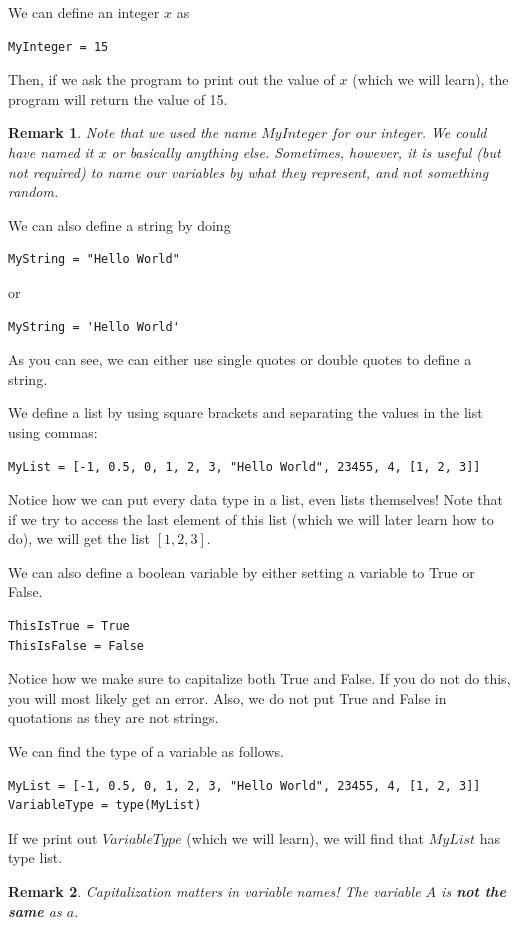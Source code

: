 \documentclass{article}
\newtheorem*{remark}{Remark}
\begin{document}
We can define an integer $x$ as 
\begin{lstlisting}
MyInteger = 15
\end{lstlisting}
Then, if we ask the program to print out the value of $x$ (which we will learn), the program will return the value of 15. 
\begin{remark}
Note that we used the name $MyInteger$ for our integer. We could have named it $x$ or basically anything else. Sometimes, however, it is useful (but not required) to name our variables by what they represent, and not something random. 
\end{remark}
We can also define a string by doing 
\begin{lstlisting}
MyString = "Hello World"
\end{lstlisting}
or 
\begin{lstlisting}
MyString = 'Hello World'
\end{lstlisting}
As you can see, we can either use single quotes or double quotes to define a string.

We define a list by using square brackets and separating the values in the list using commas:
\begin{lstlisting}
MyList = [-1, 0.5, 0, 1, 2, 3, "Hello World", 23455, 4, [1, 2, 3]]
\end{lstlisting}
Notice how we can put every data type in a list, even lists themselves! Note that if we try to access the last element of this list (which we will later learn how to do), we will get the list $[1,2,3]$. 

We can also define a boolean variable by either setting a variable to True or False.
\begin{lstlisting}
ThisIsTrue = True
ThisIsFalse = False
\end{lstlisting}
Notice how we make sure to capitalize both True and False. If you do not do this, you will most likely get an error. Also, we do not put True and False in quotations as they are not strings. 

We can find the type of a variable as follows.
\begin{lstlisting}
MyList = [-1, 0.5, 0, 1, 2, 3, "Hello World", 23455, 4, [1, 2, 3]]
VariableType = type(MyList)
\end{lstlisting}
If we print out $VariableType$ (which we will learn), we will find that $MyList$ has type list. 
\begin{remark}
Capitalization matters in variable names! The variable $A$ is \textbf{not the same} as $a$. 
\end{remark}
\end{document}
